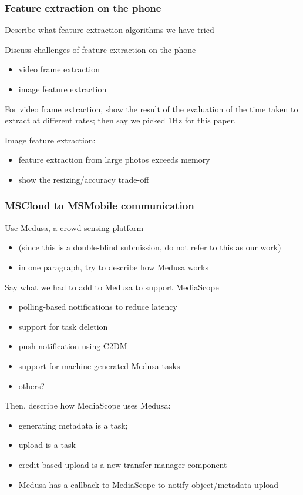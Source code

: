\documentclass[10pt]{article}
\begin{document}
\subsubsection{Feature extraction on the phone}
\label{sec-3-2-3}


Describe what feature extraction algorithms we have tried

Discuss challenges of feature extraction on the phone
\begin{itemize}
\item video frame extraction
\item image feature extraction
\end{itemize}

For video frame extraction, show the result of the evaluation of the
time taken to extract at different rates; then say we picked 1Hz for
this paper.

Image feature extraction:
\begin{itemize}
\item feature extraction from large photos exceeds memory
\item show the resizing/accuracy trade-off
\end{itemize}
\subsubsection{MSCloud to MSMobile communication}
\label{sec-3-2-4}


Use Medusa, a crowd-sensing platform
\begin{itemize}
\item (since this is a double-blind submission, do not refer to this as
    our work)
\item in one paragraph, try to describe how Medusa works
\end{itemize}

Say what we had to add to Medusa to support MediaScope
\begin{itemize}
\item polling-based notifications to reduce latency
\item support for task deletion
\item push notification using C2DM
\item support for machine generated Medusa tasks
\item others?
\end{itemize}

Then, describe how MediaScope uses Medusa:
\begin{itemize}
\item generating metadata is a task;
\item upload is a task
\item credit based upload is a new transfer manager component
\item Medusa has a callback to MediaScope to notify object/metadata upload
\end{itemize}
\end{document}
